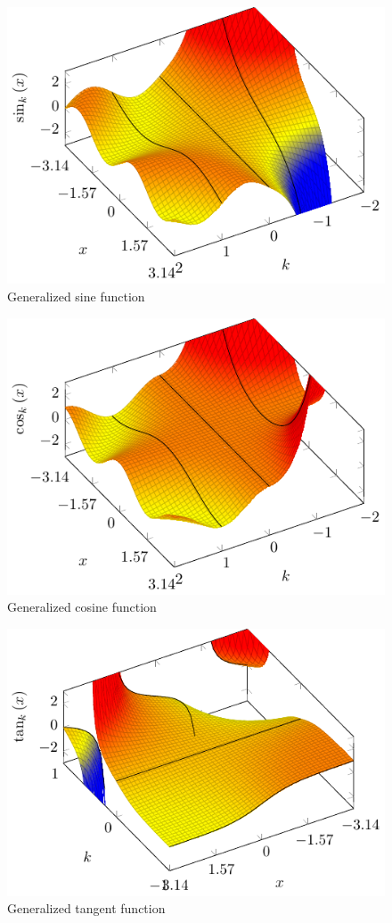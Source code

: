 \documentclass[stu, babel, american, biblatex, a4paper, draftall]{apa7}
\begin{document}
\begin{figure}
    \centering
    \includegraphics[width=\textwidth]{trigonometric/sine.pdf}
    \caption{Generalized sine function}\label{TrigonometrySinePlotted}
\end{figure}
\begin{figure}
    \centering
    \includegraphics[width=\textwidth]{trigonometric/cosine.pdf}
    \caption{Generalized cosine function}\label{TrigonometryCosinePlotted}
\end{figure}
\begin{figure}
    \centering
    \includegraphics[width=\textwidth]{trigonometric/tangent.pdf}
    \caption{Generalized tangent function}\label{TrigonometryTangentPlotted}
\end{figure}
\end{document}
